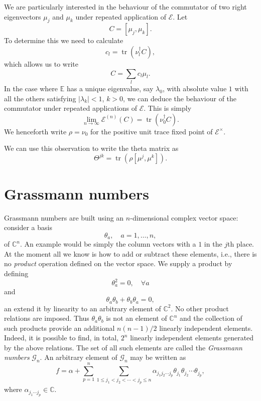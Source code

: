 \documentclass[prl,twocolumn,lengthcheck,superscriptaddress]{revtex4-1}
\newcommand{\tr}{\operatorname{tr}}
\theoremstyle{definition}
\theoremstyle{remark}
\begin{document}
We are particularly interested in the behaviour of the commutator of two right eigenvectors $\mu_j$ and $\mu_k$ under repeated application of $\mathcal{E}$. Let 
\begin{equation}
	C = [\mu_j, \mu_k].
\end{equation}
To determine this we need to calculate
\begin{equation}
	c_l = \tr(\nu^\dag_l C),
\end{equation}
which allows us to write
\begin{equation}
	C = \sum_{l} c_l \mu_l.
\end{equation}
In the case where $\mathbb{E}$ has a unique eigenvalue, say $\lambda_0$, with absolute value $1$ with all the others satisfying $|\lambda_k| < 1$, $k > 0$, we can deduce the behaviour of the commutator under repeated applications of $\mathcal{E}$. This is simply 
\begin{equation}
	\lim_{n\rightarrow \infty}\mathcal{E}^{(n)}(C) = \tr(\nu_0^\dag C).
\end{equation}
We henceforth write $\rho = \nu_0$ for the positive unit trace fixed point of $\mathcal{E}^\times$.

We can use this observation to write the theta matrix as
\begin{equation}
	\Theta^{jk} = \tr(\rho [\mu^j, \mu^k]).
\end{equation}

\section{Grassmann numbers}
Grassmann numbers are built using an $n$-dimensional complex vector space: consider a basis
\begin{equation}
	\theta_a, \quad a = 1, \ldots, n,
\end{equation}
of $\mathbb{C}^n$. An example would be simply the column vectors with a $1$ in the $j$th place. At the moment all we know is how to add or subtract these elements, i.e., there is no \emph{product} operation defined on the vector space. We supply a product by defining
\begin{equation}
	\theta_a^2 = 0, \quad \forall a
\end{equation}
and
\begin{equation}
	\theta_a\theta_b + \theta_b \theta_a = 0,
\end{equation}
an extend it by linearity to an arbitrary element of $\mathbb{C}^2$. No other product relations are imposed. Thus $\theta_a\theta_b$ is not an element of $\mathbb{C}^n$ and the collection of such products provide an additional $n(n-1)/2$  linearly independent elements. Indeed, it is possible to find, in total, $2^n$ linearly independent elements generated by the above relations. The set of all such elements are called the \emph{Grassmann numbers} $\mathcal{G}_n$. An arbitrary element of $\mathcal{G}_n$ may be written as 
\begin{equation}
	f = \alpha + \sum_{p=1}^n\sum_{1 \le j_1 < j_2 < \cdots < j_p \le n}\alpha_{j_1j_2\cdots j_p} \theta_{j_1}\theta_{j_2}\cdots \theta_{j_p},
\end{equation} 
where $\alpha_{j_1\cdots j_p} \in \mathbb{C}$.
\end{document}
